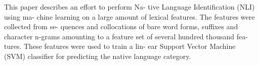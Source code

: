 This paper describes an effort to perform Na- tive Language Identification (NLI) using ma- chine learning on a large amount of lexical features. The
 features were collected from se- quences and collocations of bare word forms,
 suffixes and character n-grams amounting to a feature set of several hundred
 thousand fea- tures. These features were used to train a lin- ear Support
 Vector Machine (SVM) classifier for predicting the native language category.

